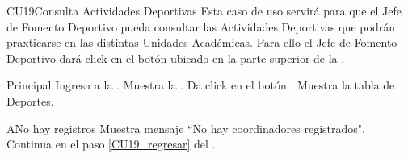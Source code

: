 \begin{UseCase}{CU19}{Consulta Actividades Deportivas}{
		\noindent Esta caso de uso servirá para que el Jefe de Fomento Deportivo pueda consultar las Actividades Deportivas que podrán praxticarse en las distintas Unidades Académicas.
		Para ello el Jefe de Fomento Deportivo dará click en el botón  ubicado en la  parte superior de la .	
	} \label{CU19_evento}

		\end{UseCase}
	
    \begin{UCtrayectoria}{Principal}
    \UCpaso[\UCactor] Ingresa a la .
    \UCpaso Muestra la . \label{CU19_regresar}
    \UCpaso[\UCactor] Da click en el botón .  
    \UCpaso Muestra la tabla de Deportes. 
    \end{UCtrayectoria}
    
    \begin{UCtrayectoriaA}{A}{No hay registros}
    	\UCpaso Muestra mensaje “No hay coordinadores registrados".
    	\UCpaso Continua en el paso \ref{CU19_regresar} del .
    \end{UCtrayectoriaA}


	



